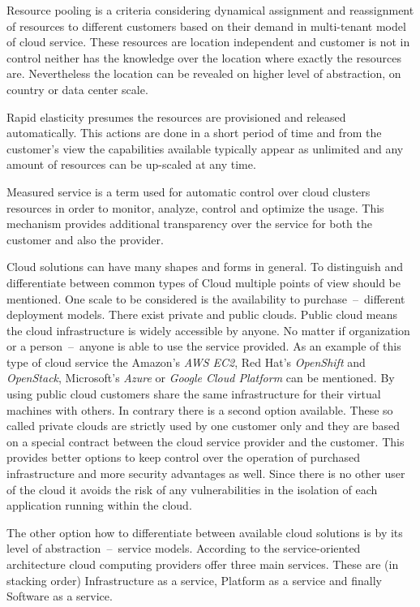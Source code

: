 Resource pooling is a criteria considering dynamical assignment and reassignment of resources to different customers based on their demand in multi-tenant model of cloud service. These resources are location independent and customer is not in control neither has the knowledge over the location where exactly the resources are. Nevertheless the location can be revealed on higher level of abstraction, on country or data center scale.

Rapid elasticity presumes the resources are provisioned and released automatically. This actions are done in a short period of time and from the customer's view the capabilities available typically appear as unlimited and any amount of resources can be up-scaled at any time.

Measured service is a term used for automatic control over cloud clusters resources in order to monitor, analyze, control and optimize the usage. This mechanism provides additional transparency over the service for both the customer and also the provider.

Cloud solutions can have many shapes and forms in general. To distinguish and differentiate between common types of Cloud multiple points of view should be mentioned. One scale to be considered is the availability to purchase \,--\, different deployment models. There exist private and public clouds. Public cloud means the cloud infrastructure is widely accessible by anyone. No matter if organization or a person \,--\, anyone is able to use the service provided. As an example of this type of cloud service the Amazon's \emph{AWS EC2}, Red Hat's \emph{OpenShift} and \emph{OpenStack}, Microsoft's \emph{Azure} or \emph{Google Cloud Platform} can be mentioned. By using public cloud customers share the same infrastructure for their virtual machines with others. In contrary there is a second option available. These so called private clouds are strictly used by one customer only and they are based on a special contract between the cloud service provider and the customer. This provides better options to keep control over the operation of purchased infrastructure and more security advantages as well. Since there is no other user of the cloud it avoids the risk of any vulnerabilities in the isolation of each application running within the cloud.

The other option how to differentiate between available cloud solutions is by its level of abstraction \,--\, service models. According to the service-oriented architecture cloud computing providers offer three main services. These are (in stacking order) Infrastructure as a service, Platform as a service and finally Software as a service.

